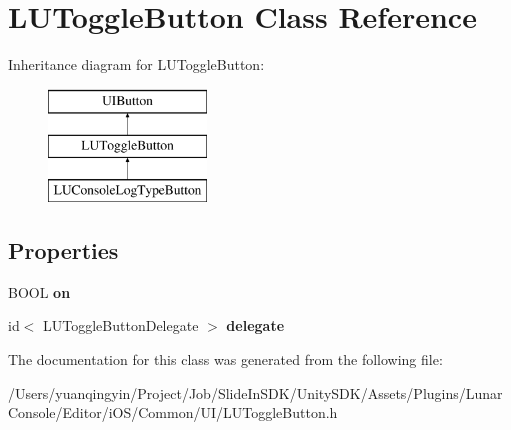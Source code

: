 \hypertarget{interface_l_u_toggle_button}{}\section{L\+U\+Toggle\+Button Class Reference}
\label{interface_l_u_toggle_button}
Inheritance diagram for L\+U\+Toggle\+Button\+:\begin{figure}[H]
\begin{center}
\leavevmode
\includegraphics[height=3.000000cm]{interface_l_u_toggle_button}
\end{center}
\end{figure}
\subsection*{Properties}
\begin{DoxyCompactItemize}
\item 
\mbox{\label{interface_l_u_toggle_button_a06dd4aa0d3539aab13fb30fcb865f390}} 
B\+O\+OL {\bfseries on}
\item 
\mbox{\label{interface_l_u_toggle_button_a303ba25a8d615671a17e5f482c7af40f}} 
id$<$ L\+U\+Toggle\+Button\+Delegate $>$ {\bfseries delegate}
\end{DoxyCompactItemize}


The documentation for this class was generated from the following file\+:\begin{DoxyCompactItemize}
\item 
/\+Users/yuanqingyin/\+Project/\+Job/\+Slide\+In\+S\+D\+K/\+Unity\+S\+D\+K/\+Assets/\+Plugins/\+Lunar\+Console/\+Editor/i\+O\+S/\+Common/\+U\+I/L\+U\+Toggle\+Button.\+h\end{DoxyCompactItemize}
